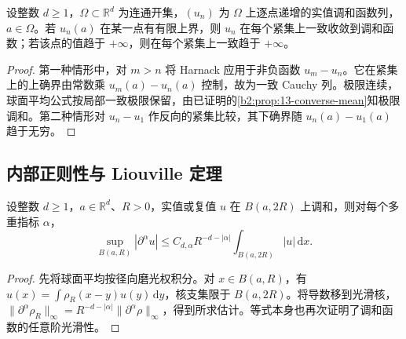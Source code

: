 \begin{corollary}\label{b2:cor:13-harnack-convergence}
设整数 \(d\geq1\)，\(\Omega\subset\mathbb R^d\) 为连通开集，\((u_n)\) 为 \(\Omega\) 上逐点递增的实值调和函数列，\(a\in\Omega\)。若 \(u_n(a)\) 在某一点有有限上界，则 \(u_n\) 在每个紧集上一致收敛到调和函数；若该点的值趋于 \(+\infty\)，则在每个紧集上一致趋于 \(+\infty\)。
\end{corollary}
\begin{proof}
第一种情形中，对 \(m>n\) 将 Harnack 应用于非负函数 \(u_m-u_n\)。它在紧集上的上确界由常数乘 \(u_m(a)-u_n(a)\) 控制，故为一致 Cauchy 列。极限连续，球面平均公式按局部一致极限保留，由已证明的\cref{b2:prop:13-converse-mean}知极限调和。第二种情形对 \(u_n-u_1\) 作反向的紧集比较，其下确界随 \(u_n(a)-u_1(a)\) 趋于无穷。
\end{proof}

\subsection{内部正则性与 Liouville 定理}
\label{b2:subsec:130104}

\begin{proposition}[内部导数估计]\label{b2:prop:13-interior-derivatives}
设整数 \(d\geq1\)，\(a\in\mathbb R^d\)、\(R>0\)，实值或复值 \(u\) 在 \(B(a,2R)\) 上调和，则对每个多重指标 \(\alpha\)，
\[
 \sup_{B(a,R)}|\partial^\alpha u|
 \leq C_{d,\alpha}R^{-d-|\alpha|}\int_{B(a,2R)}|u|\,\mathrm{d}x.
\]
\end{proposition}
\begin{proof}
先将球面平均按径向磨光权积分。对 \(x\in B(a,R)\)，有 \(u(x)=\int\rho_R(x-y)u(y)\,\mathrm{d}y\)，核支集限于 \(B(a,2R)\)。将导数移到光滑核，\(\|\partial^\alpha\rho_R\|_\infty=R^{-d-|\alpha|}\|\partial^\alpha\rho\|_\infty\)，得到所求估计。等式本身也再次证明了调和函数的任意阶光滑性。
\end{proof}

